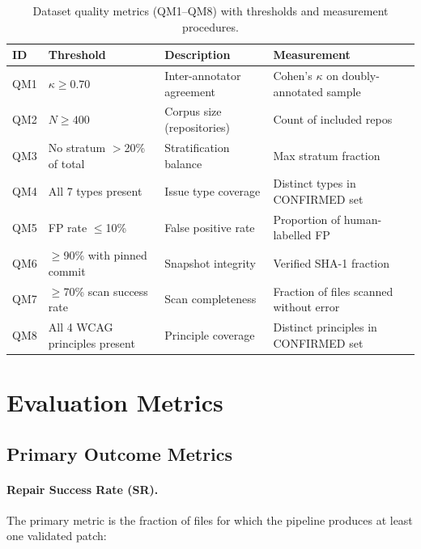 \begin{table}[htbp]
\caption{Dataset quality metrics (QM1--QM8) with thresholds and
  measurement procedures.}
\label{tab:qm}
\centering\small
\renewcommand{\arraystretch}{1.3}
\begin{tabular}{llp{}p{}}
\toprule
\textbf{ID} & \textbf{Threshold} & \textbf{Description} & \textbf{Measurement} \\
\midrule
QM1 & $\kappa \geq 0.70$ & Inter-annotator agreement & Cohen's $\kappa$ on doubly-annotated sample \\
QM2 & $N \geq 400$ & Corpus size (repositories) & Count of included repos \\
QM3 & No stratum $>$20\% of total & Stratification balance & Max stratum fraction \\
QM4 & All 7 types present & Issue type coverage & Distinct types in CONFIRMED set \\
QM5 & FP rate $\leq$10\% & False positive rate & Proportion of human-labelled FP \\
QM6 & $\geq$90\% with pinned commit & Snapshot integrity & Verified SHA-1 fraction \\
QM7 & $\geq$70\% scan success rate & Scan completeness & Fraction of files scanned without error \\
QM8 & All 4 WCAG principles present & Principle coverage & Distinct principles in CONFIRMED set \\
\bottomrule
\end{tabular}
\end{table}

\section{Evaluation Metrics}
\label{sec:metrics}

\subsection{Primary Outcome Metrics}

\paragraph{Repair Success Rate (SR).}
The primary metric is the fraction of files for which the pipeline produces
at least one validated patch:

